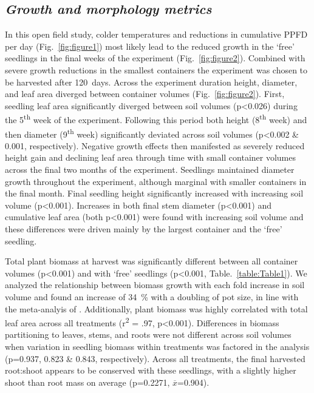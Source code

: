 \documentclass[a4paper]{article}\usepackage[]{graphicx}\usepackage[]{color}
\begin{document}
\subsection*{\textit{Growth and morphology metrics}}
In this open field study, colder temperatures and reductions in cumulative PPFD per day (Fig.~\ref{fig:figure1}) most likely lead to the reduced growth in the ‘free’ seedlings in the final weeks of the experiment (Fig.~\ref{fig:figure2}).  Combined with severe growth reductions in the smallest containers the experiment was chosen to be harvested after 120~days. Across the experiment duration height, diameter, and leaf area diverged between container volumes (Fig.~\ref{fig:figure2}).  First, seedling leaf area significantly diverged between soil volumes (p\textless0.026) during the 5\textsuperscript{th} week of the experiment. Following this period both height (8\textsuperscript{th} week) and then diameter (9\textsuperscript{th} week) significantly deviated across soil volumes (p\textless0.002 \& 0.001, respectively).  Negative growth effects then manifested as severely reduced height gain and declining leaf area through time with small container volumes across the final two months of the experiment. Seedlings maintained diameter growth throughout the experiment, although marginal with smaller containers in the final month. Final seedling height significantly increased with increasing soil volume (p\textless0.001).  Increases in both final stem diameter (p\textless0.001) and cumulative leaf area (both p\textless0.001) were found with increasing soil volume and these differences were driven mainly by the largest container and the ‘free’ seedling.

Total plant biomass at harvest was significantly different between all container volumes (p\textless0.001) and with ‘free’ seedlings (p\textless0.001, Table.~\ref{table:Table1}). We analyzed the relationship between biomass growth with each fold increase in soil volume and found an increase of 34~\% with a doubling of pot size, in line with the meta-analyis of \citet{poorter2012pot}. Additionally, plant biomass was highly correlated with total leaf area across all treatments (r\textsuperscript{2} = .97, p\textless0.001). Differences in biomass partitioning to leaves, stems, and roots were not different across soil volumes when variation in seedling biomass within treatments was factored in the analysis (p=0.937, 0.823 \& 0.843, respectively). Across all treatments, the final harvested root:shoot appears to be conserved with these seedlings, with a slightly higher shoot than root mass on average (p=0.2271, $\overline{x}$=0.904).
\end{document}
